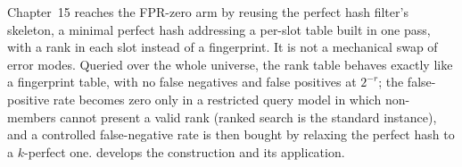 Chapter~15 reaches the FPR-zero arm by reusing the perfect hash filter's
skeleton, a minimal perfect hash addressing a per-slot table built in
one pass, with a rank in each slot instead of a fingerprint. It is not a
mechanical swap of error modes. Queried over the whole universe, the rank
table behaves exactly like a fingerprint table, with no false negatives
and false positives at $2^{-r}$; the false-positive rate becomes zero
only in a restricted query model in which non-members cannot present a
valid rank (ranked search is the standard instance), and a controlled
false-negative rate is then bought by relaxing the perfect hash to a
$k$-perfect one.  develops the
construction and its application.
